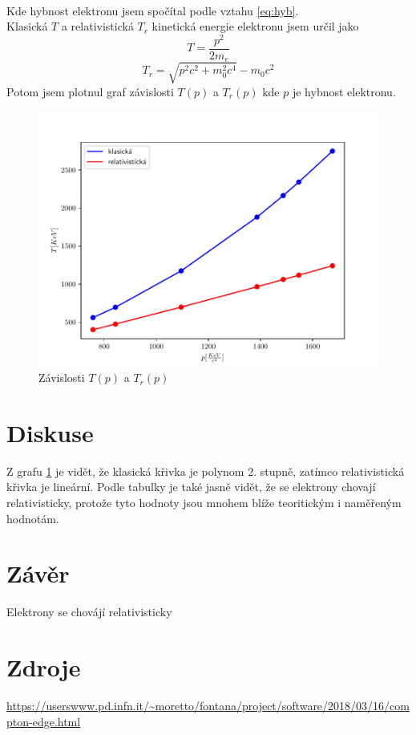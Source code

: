\documentclass{article}
\begin{document}
\vspace{1em}
\\
Kde hybnost elektronu jsem spočítal podle vztahu \ref{eq:hyb}.\\
Klasická $T$ a relativistická $T_{r}$ kinetická energie elektronu jsem určil jako
$$T = \frac{p^{2}}{2m_{e}}$$
$$T_{r} = \sqrt{ p^{2}c^{2} + m_{0}^{2}c^{4} } - m_{0}c^{2}$$
Potom jsem plotnul graf závislosti $T(p)$ a $T_{r}(p)$ kde $p$ je hybnost elektronu.
\begin{figure}[!h]
  \hspace*{0em}
  \includegraphics[scale=0.6]{figs/fig1.pdf}
  \caption{Závislosti $T(p)$ a $T_{r}(p)$}
  \label{gf:tp}
\end{figure}
\section{Diskuse}
Z grafu \ref{gf:tp} je vidět, že klasická křivka je polynom 2. stupně,
zatímco relativistická křivka je lineární. Podle tabulky je také jasně vidět,
že se elektrony chovají relativisticky, protože tyto hodnoty jsou mnohem blíže teoritickým i naměřeným hodnotám.
\section{Závěr}
Elektrony se chovájí relativisticky
\section{Zdroje}
\url{
  https://userswww.pd.infn.it/~moretto/fontana/project/software/2018/03/16/compton-edge.html
  }
\end{document}
